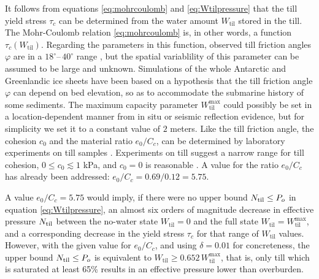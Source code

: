 \documentclass[gmd]{copernicus}   %
\newcommand{\text}{\textrm}
\newcommand{\Wtil}{W_{\text{til}}}
\newcommand{\Wtilmax}{W_{\text{til}}^{\text{max}}}
\begin{document}
It follows from equations \eqref{eq:mohrcoulomb} and \eqref{eq:Wtilpressure} that the till yield stress $\tau_c$ can be determined from the water amount $\Wtil$ stored in the till.  The Mohr-Coulomb relation \eqref{eq:mohrcoulomb} is, in other words, a function $\tau_c(\Wtil)$.  Regarding the parameters in this function, observed till friction angles $\varphi$ are in a $18^\circ$--\,$40^\circ$ range \citep{CuffeyPaterson}, but the spatial variablility of this parameter can be assumed to be large and unknown.  Simulations of the whole Antarctic \citep{Martinetal2011} and Greenlandic \citep[see supplement]{AschwandenAdalgeirsdottirKhroulev} ice sheets have been based on a hypothesis that the till friction angle $\varphi$ can depend on bed elevation, so as to accommodate the submarine history of some sediments.  The maximum capacity parameter $\Wtilmax$ could possibly be set in a location-dependent manner from in situ \citep{Tulaczyketal2000} or seismic reflection \citep{TrufferHarrisonEchelmeyer2000} evidence, but for simplicity we set it to a constant value of $2$ meters.  Like the till friction angle, the cohesion $c_0$ and the material ratio $e_0/C_c$, can be determined by laboratory experiments on till samples \citep[e.g.][]{Hookeetal1997,Tulaczyketal2000}.  Experiments on till suggest a narrow range for till cohesion, $0 \le c_0 \lesssim 1$ kPa, and $c_0=0$ is reasonable \citep{Tulaczyketal2000}.     A value for the ratio $e_0/C_c$ has already been addressed: $e_0/C_c=0.69/0.12=5.75$.

A value $e_0/C_c=5.75$ would imply, if there were no upper bound $\Ntil \le P_o$ in equation \eqref{eq:Wtilpressure}, an almost six orders of magnitude decrease in effective pressure $\Ntil$ between the no-water state $\Wtil=0$ and the full state $\Wtil=\Wtilmax$, and a corresponding decrease in the yield stress $\tau_c$ for that range of $\Wtil$ values.  However, with the given value for $e_0/C_c$, and using $\delta = 0.01$ for concreteness, the upper bound $\Ntil \le P_o$ is equivalent to $\Wtil \ge 0.652\, \Wtilmax$, that is, only till which is saturated at least 65\% results in an effective pressure lower than overburden.
\end{document}
